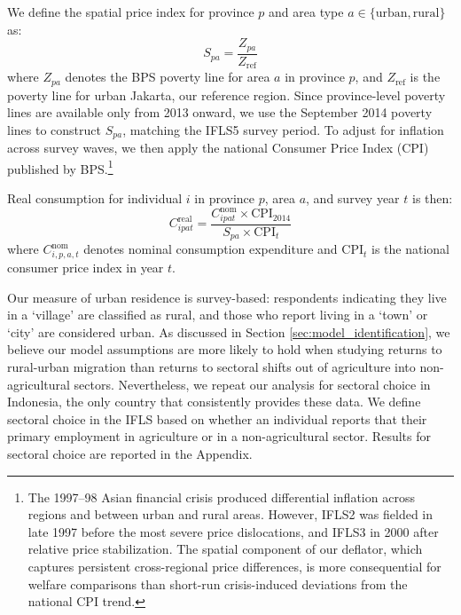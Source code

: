 We define the spatial price index for province $p$ and area type $a \in \{\text{urban}, \text{rural}\}$ as:
\begin{equation}
    S_{pa} = \frac{Z_{pa}}{Z_{\text{ref}}}
\end{equation}
where $Z_{pa}$ denotes the BPS poverty line for area $a$ in province $p$, and $Z_{\text{ref}}$ is the poverty line for urban Jakarta, our reference region.
Since province-level poverty lines are available only from 2013 onward, we use the September 2014 poverty lines to construct $S_{pa}$, matching the IFLS5 survey period. To adjust for inflation across survey waves, we then apply the national Consumer Price Index (CPI) published by BPS.\footnote{The 1997--98 Asian financial crisis produced differential inflation across regions and between urban and rural areas. However, IFLS2 was fielded in late 1997 before the most severe price dislocations, and IFLS3 in 2000 after relative price stabilization. The spatial component of our deflator, which captures persistent cross-regional price differences, is more consequential for welfare comparisons than short-run crisis-induced deviations from the national CPI trend.}

Real consumption for individual $i$ in province $p$, area $a$, and survey year $t$ is then:
\begin{equation}
    C^{\text{real}}_{ipat} = \frac{C^{\text{nom}}_{ipat} \times \text{CPI}_{2014}}{S_{pa} \times \text{CPI}_t}
\end{equation}
where $C^{\text{nom}}_{i,p,a,t}$ denotes nominal consumption expenditure and $\text{CPI}_t$ is the national consumer price index in year $t$.

Our measure of urban residence is survey-based: respondents indicating they live in a `village' are classified as rural, and those who report living in a `town' or `city' are considered urban. As discussed in Section \ref{sec:model_identification}, we believe our model assumptions are more likely to hold when studying returns to rural-urban migration than returns to sectoral shifts out of agriculture into non-agricultural sectors. Nevertheless, we repeat our analysis for sectoral choice in Indonesia, the only country that consistently provides these data. 
We define sectoral choice in the IFLS based on whether an individual reports that their primary employment in agriculture or in a non-agricultural sector.
Results for sectoral choice are reported in the Appendix.

\begin{landscape}

\end{landscape}
% 

